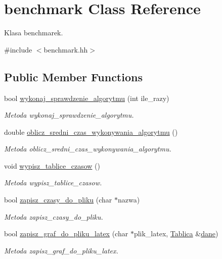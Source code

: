 \hypertarget{classbenchmark}{\section{benchmark Class Reference}
\label{classbenchmark}
}


Klasa benchmarek.  




{\ttfamily \#include $<$benchmark.\+hh$>$}

\subsection*{Public Member Functions}
\begin{DoxyCompactItemize}
\item 
bool \hyperlink{classbenchmark_ab83ffeb122d3cc231acdbf45db4f5ff8}{wykonaj\+\_\+sprawdzenie\+\_\+algorytmu} (int ile\+\_\+razy)
\begin{DoxyCompactList}\small\item\em Metoda wykonaj\+\_\+sprawdzenie\+\_\+algorytmu. \end{DoxyCompactList}\item 
double \hyperlink{classbenchmark_a47af0a6ddc3d1e5afe3324f166ae1292}{oblicz\+\_\+sredni\+\_\+czas\+\_\+wykonywania\+\_\+algorytmu} ()
\begin{DoxyCompactList}\small\item\em Metoda oblicz\+\_\+sredni\+\_\+czas\+\_\+wykonywania\+\_\+algorytmu. \end{DoxyCompactList}\item 
void \hyperlink{classbenchmark_ad2fa742abac2df08a8a3174ca0cd2a09}{wypisz\+\_\+tablice\+\_\+czasow} ()
\begin{DoxyCompactList}\small\item\em Metoda wypisz\+\_\+tablice\+\_\+czasow. \end{DoxyCompactList}\item 
bool \hyperlink{classbenchmark_a452c061a57050dacd3429ad5186b49fe}{zapisz\+\_\+czasy\+\_\+do\+\_\+pliku} (char $\ast$nazwa)
\begin{DoxyCompactList}\small\item\em Metoda zapisz\+\_\+czasy\+\_\+do\+\_\+pliku. \end{DoxyCompactList}\item 
bool \hyperlink{classbenchmark_a880b885f576849cc98ee1ced757cb99d}{zapisz\+\_\+graf\+\_\+do\+\_\+pliku\+\_\+latex} (char $\ast$plik\+\_\+latex, \hyperlink{class_tablica}{Tablica} \&\hyperlink{classbenchmark_a300d21139d46ca60159c0105bb2504e9}{dane})
\begin{DoxyCompactList}\small\item\em Metoda zapisz\+\_\+graf\+\_\+do\+\_\+pliku\+\_\+latex. \end{DoxyCompactList}\end{DoxyCompactItemize}
